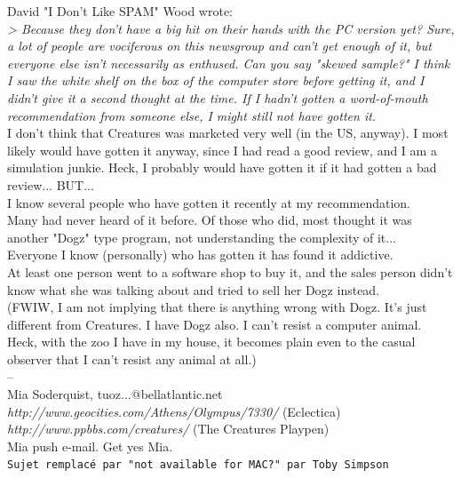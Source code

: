 \documentclass[11pt,twoside,a4paper]{article}
\begin{document}
\begin{multicols*}{2}
David "I Don't Like SPAM" Wood wrote:~\\
\emph{> Because they don't have a big hit on their hands with the PC version yet? Sure, a lot of people are vociferous on this newsgroup and can't get enough of it, but everyone else isn't necessarily as enthused. Can you say "skewed sample?" I think I saw the white shelf on the box of the computer store before getting it, and I didn't give it a second thought at the time. If I hadn't gotten a word-of-mouth recommendation from someone else, I might still not have gotten it.}~\\

I don't think that Creatures was marketed very well (in the US, anyway).  I most likely would have gotten it anyway, since I had read a good review, and I am a simulation junkie. Heck, I probably would have gotten it if it had gotten a bad review... BUT...~\\
I know several people who have gotten it recently at my recommendation.~\\
Many had never heard of it before. Of those who did, most thought it was another "Dogz" type program, not understanding the complexity of it...~\\
Everyone I know (personally) who has gotten it has found it addictive.~\\

At least one person went to a software shop to buy it, and the sales person didn't know what she was talking about and tried to sell her Dogz instead.~\\

(FWIW, I am not implying that there is anything wrong with Dogz. It's just different from Creatures. I have Dogz also. I can't resist a computer animal. Heck, with the zoo I have in my house, it becomes plain even to the casual observer that I can't resist any animal at all.)~\\
-- ~\\
Mia Soderquist, tuoz...@bellatlantic.net~\\
\emph{http://www.geocities.com/Athens/Olympus/7330/} (Eclectica)~\\
\emph{http://www.ppbbs.com/creatures/} (The Creatures Playpen)~\\
Mia push e-mail. Get yes Mia.~\\

 
		
	
		
\texttt{Sujet remplac{\'e} par "not available for MAC?" par Toby Simpson}~\\
		

\end{multicols*}
\end{document}
